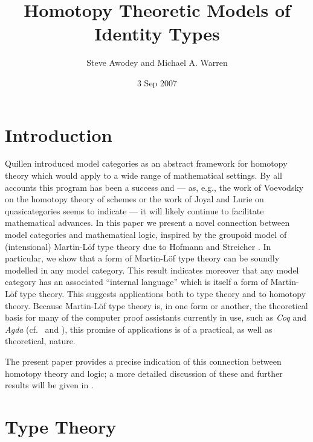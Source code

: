 \documentclass[12pt]{amsart}
\theoremstyle{definition}
\theoremstyle{remark}
\begin{document}
\author{Steve Awodey and Michael A. Warren}
\date{3 Sep 2007}
\address{Department of Philosophy\\Carnegie Mellon
  University\\Pittsburgh, PA\\USA 15213}

\title[identity types]{Homotopy Theoretic Models of Identity Types}
\maketitle
\section{Introduction}

\noindent Quillen \cite{Quillen:HA} introduced model categories as an
abstract framework for homotopy theory which would apply to a wide
range of mathematical settings.  By all accounts this program has been
a success and ---  as, e.g., the work of Voevodsky on the homotopy theory of
schemes \cite{Morel:A1HTS} or the work of Joyal
\cite{Joyal:QCKC,Joyal:NOQC} and Lurie \cite{Lurie:HTT} on
quasicategories seems to indicate --- it will likely continue to
facilitate mathematical advances.  In this paper we present a
novel connection between model categories and mathematical logic, inspired by
the groupoid model of (intensional) Martin-L\"{o}f type theory
\cite{MartinLof:ITT} due to Hofmann and Streicher \cite{Hofmann:GITT}.  In
particular, we show that a form of Martin-L\"{o}f type
theory can be soundly modelled in any model
category.  This result indicates moreover that any model category
has an associated ``internal language'' which is itself a form of
Martin-L\"{o}f type theory.  This suggests applications both to
type theory and to homotopy theory.  Because Martin-L\"{o}f type
theory is, in one form or another, the theoretical basis for many of
the computer proof assistants currently in use, such as \emph{Coq} and
\emph{Agda} (cf.~\cite{Bertot:ITPPD} and \cite{Coquand:STT}),
this promise of applications is of a practical, as well as theoretical, nature.

The present paper provides a precise indication of this connection
between homotopy theory and logic; a more detailed discussion
of these and further results will be given in \cite{Warren:PhD}.

\section{Type Theory}\label{section:type_theory}
\end{document}
